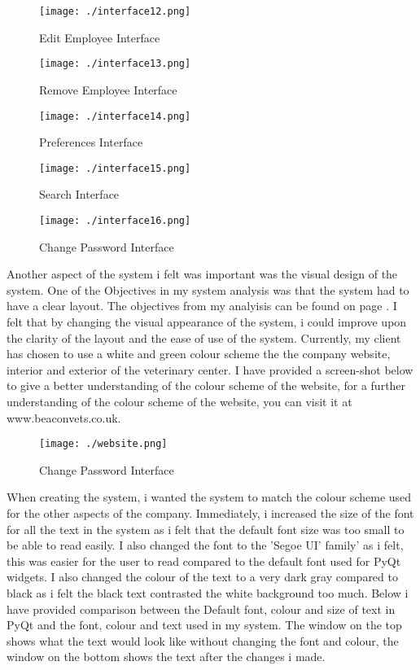\begin{figure}[H]
    \texttt{[image: ./interface12.png]}
    \caption{Edit Employee Interface} \label{fig:edit-employee-interface}
\end{figure}

\begin{figure}[H]
    \texttt{[image: ./interface13.png]}
    \caption{Remove Employee Interface} \label{fig:removing-employee-interface}
\end{figure}

\begin{figure}[H]
    \texttt{[image: ./interface14.png]}
    \caption{Preferences Interface} \label{fig:preferences-interface}
\end{figure}

\begin{figure}[H]
    \texttt{[image: ./interface15.png]}
    \caption{Search Interface} \label{fig:search-interface}
\end{figure}

\begin{figure}[H]
    \texttt{[image: ./interface16.png]}
    \caption{Change Password Interface} \label{fig:change-password-interface}
\end{figure}

Another aspect of the system i felt was important was the visual design of the system. One of the Objectives in my system analysis was that the system had to have a clear layout. The objectives from my analyisis can be found on page \pageref{ref:objectives}. I felt that by changing the visual appearance of the system, i could improve upon the clarity of the layout and the ease of use of the system. Currently, my client has chosen to use a white and green colour scheme the the company website, interior and exterior of the veterinary center. I have provided a screen-shot below to give a better understanding of the colour scheme of the website, for a further understanding of the colour scheme of the website, you can visit it at www.beaconvets.co.uk.

\begin{figure}[H]
    \texttt{[image: ./website.png]}
    \caption{Change Password Interface} \label{fig:website.}
\end{figure}

When creating the system, i wanted the system to match the colour scheme used for the other aspects of the company. Immediately, i increased the size of the font for all the text in the system as i felt that the default font size was too small to be able to read easily. I also changed the font to the 'Segoe UI' family' as i felt, this was easier for the user to read compared to the default font used for PyQt widgets. I also changed the colour of the text to a very dark gray compared to black as i felt the black text contrasted the white background too much. Below i have provided comparison between the Default font, colour and size of text in PyQt and the font, colour and text used in my system. The window on the top shows what the text would look like without changing the font and colour, the window on the bottom shows the text after the changes i made.

